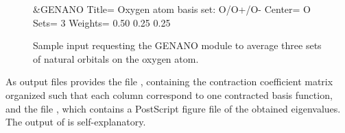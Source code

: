 \begin{figure}[h]
\caption{Sample input requesting the GENANO module to
average three sets of natural orbitals on the oxygen atom.}
\label{fig:genano_input}
\begin{inputlisting}
 &GENANO
Title= Oxygen atom basis set: O/O+/O-
Center= O
Sets= 3
Weights= 0.50 0.25 0.25
\end{inputlisting}
\end{figure}

As output files  provides the file ,
containing the contraction coefficient matrix organized such that each column 
correspond to one contracted basis function, and the file , which 
contains a PostScript figure file of the obtained eigenvalues. The output of 
 is self-explanatory.

